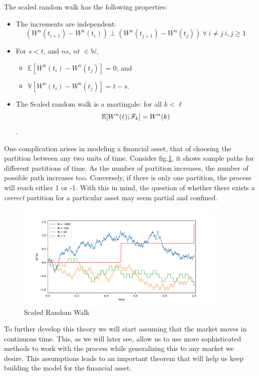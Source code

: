\documentclass[../TGMAFFIRO]{subfiles}
\begin{document}
\begin{remark}
	The scaled random walk has the following properties:
	\begin{itemize}
		\item The increments are independent: \[\left(W^n(t_{i+1}) - W^n(t_{i})\right) \perp \left(W^n(t_{j+1}) - W^n(t_{j})\right) \ \forall \ i \neq j \ i, j \geq 1\]
		\item For $s < t$, and $ns$,  $nt$ $\in \mathbb{W}$, 
		\begin{itemize}
			\item $\mathbb{E}[W^n(t_{i}) - W^n(t_{j})] = 0$; and
			\item $\mathbb{V}[W^n(t_{i}) - W^n(t_{j})] = t - s$.
		\end{itemize}
		\item The Scaled random walk is a martingale: for all $k < \ell$
		\[\mathbb{E}[W^n(\ell) | \mathscr{F}_k] = W^n(k)\].
	\end{itemize}
\end{remark}

One complication arises in modeling a financial asset, that of choosing the partition between any two units of time. Consider fig.\ref{fig:scaled_random_walk}, it shows sample paths for different partitions of time. As the number of partition increases, the number of possible path increases too. Conversely, if there is only one partition, the process will reach either 1 or -1. With this in mind, the question of whether there exists a \textit{correct} partition for a particular asset may seem partial and confined.\\

\begin{figure}[h]
	\label{fig:scaled_random_walk}
	\centering
	\includegraphics[width=0.9\textwidth]{images/scaled_random_walk}
	\caption{Scaled Random Walk}
\end{figure}


To further develop this theory we will start assuming that the market moves in continuous time. This, as we will later see, allow us to use more sophisticated methods to work with the process while generalizing this to any market we desire. This assumptions leads to an important theorem that will help us keep building the model for the financial asset.
\end{document}
